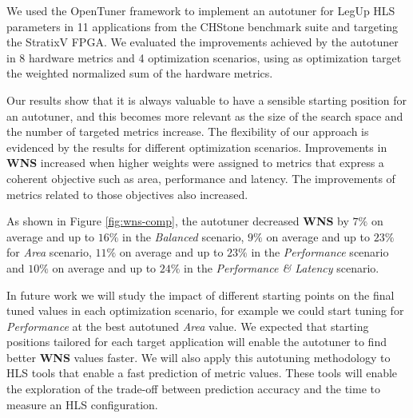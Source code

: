 We used the OpenTuner framework to implement an autotuner for LegUp HLS
parameters in 11 applications from the CHStone benchmark suite and targeting
the StratixV FPGA. We evaluated the improvements achieved by the autotuner in 8
hardware metrics and 4 optimization scenarios, using as optimization target the
weighted normalized sum of the hardware metrics.

Our results show that it is always valuable to have a sensible starting
position for an autotuner, and this becomes more relevant as the size of the
search space and the number of targeted metrics increase.  The flexibility of
our approach is evidenced by the results for different optimization scenarios.
Improvements in \textbf{WNS} increased when higher weights were assigned to
metrics that express a coherent objective such as area, performance and
latency.  The improvements of metrics related to those objectives also
increased.

As shown in Figure \ref{fig:wns-comp}, the autotuner decreased \textbf{WNS} by
$7\%$ on average and up to $16\%$ in the \textit{Balanced} scenario, $9\%$ on
average and up to $23\%$ for \textit{Area} scenario, $11\%$ on average and up
to $23\%$ in the \textit{Performance} scenario and $10\%$ on average and up to
$24\%$ in the \textit{Performance \& Latency} scenario.

In future work we will study the impact of different starting points on the
final tuned values in each optimization scenario, for example we could start
tuning for \textit{Performance} at the best autotuned \textit{Area} value.  We
expected that starting positions tailored for each target application will
enable the autotuner to find better \textbf{WNS} values faster.  We will also
apply this autotuning methodology to HLS tools that enable a fast prediction of
metric values. These tools will enable the exploration of the trade-off between
prediction accuracy and the time to measure an HLS configuration.
